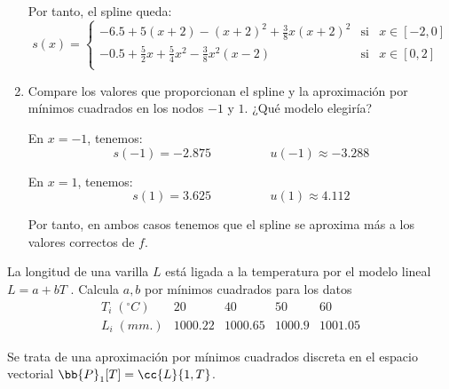 \begin{ejercicio}
\begin{enumerate}
        Por tanto, el spline queda:
        \begin{equation*}
            s(x)=\left\{\begin{array}{lll}
                -6.5 +5(x+2) -(x+2)^2 +\frac{3}{8}x(x+2)^2 & \text{si} & x\in [-2, 0] \\
                -0.5+\frac{5}{2}x + \frac{5}{4}x^2 -\frac{3}{8}x^2(x-2) & \text{si} & x\in [0,2] \\
            \end{array} \right.
        \end{equation*}

        \item Compare los valores que proporcionan el spline y la aproximación por mínimos cuadrados en los nodos $-1$ y $1$. ¿Qué modelo elegiría?

        En $x=-1$, tenemos:
        \begin{equation*}
            s(-1)= -2.875 \hspace{2cm} u(-1)\approx -3.288
        \end{equation*}

        En $x=1$, tenemos:
        \begin{equation*}
            s(1)=3.625 \hspace{2cm} u(1)\approx 4.112
        \end{equation*}

        Por tanto, en ambos casos tenemos que el spline se aproxima más a los valores correctos de $f$.
    \end{enumerate}
\end{ejercicio}


\begin{ejercicio}
    La longitud de una varilla $L$ está ligada a la temperatura por el modelo lineal $L = a+bT$ . Calcula $a, b$ por mínimos cuadrados para los datos
    \begin{equation*}
        \begin{array}{c|c|c|c|c}
            T_i\;(^\circ C) & 20 & 40 & 50 & 60 \\ \hline
            L_i\;(mm.)&  1000.22 & 1000.65 & 1000.9 & 1001.05
        \end{array}
    \end{equation*}

    Se trata de una aproximación por mínimos cuadrados discreta en el espacio vectorial $\bb{P}_1[T] = \cc{L}\{1,T\}$.
\end{ejercicio}

